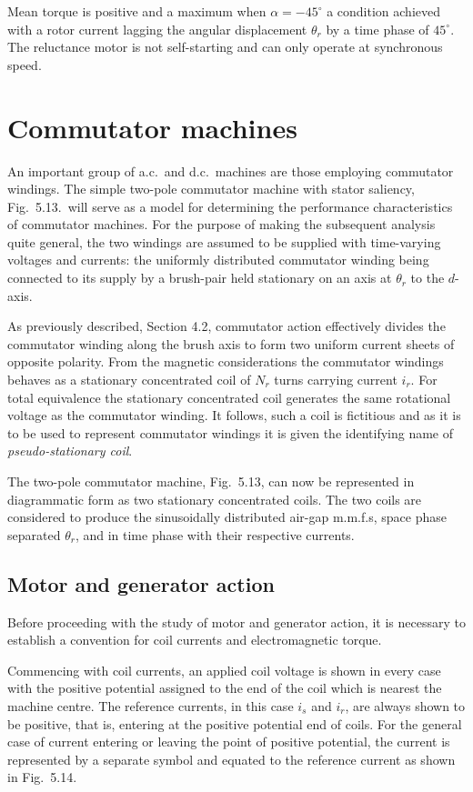 \documentclass[a4paper,numbers=noenddot,12pt]{scrbook}
\begin{document}
        Mean torque is positive and a maximum when $\alpha = -45^{\circ}$ a condition achieved with a rotor current lagging the angular displacement $\theta_r$ by a time phase of $45^{\circ}$. The reluctance motor is not self-starting and can only operate at synchronous speed.

        \section{Commutator machines}
        An important group of a.c.\ and d.c.\ machines are those employing commutator windings. The simple two-pole commutator machine with stator saliency, Fig.\ 5.13.\ will serve as a model for determining the performance characteristics of commutator machines. For the purpose of making the subsequent analysis quite general, the two windings are assumed to be supplied with time-varying voltages and currents: the uniformly distributed commutator winding being connected to its supply by a brush-pair held stationary on an axis at $\theta_r$ to the $d$-axis.

        As previously described, Section 4.2, commutator action effectively divides the commutator winding along the brush axis to form two uniform current sheets of opposite polarity. From the magnetic considerations the commutator windings behaves as a stationary concentrated coil of $N_r$ turns carrying current $i_r$. For total equivalence the stationary concentrated coil generates the same rotational voltage as the commutator winding. It follows, such a coil is fictitious and as it is to be used to represent commutator  windings it is given the identifying name of \emph{pseudo-stationary coil}.

        The two-pole commutator machine, Fig.\ 5.13, can now be represented in diagrammatic form as two stationary concentrated coils. The two coils are considered to produce the sinusoidally distributed air-gap m.m.f.s, space phase separated $\theta_r$, and in time phase with their respective currents.

        \subsection{Motor and generator action}
        Before proceeding with the study of motor and generator action, it is necessary to establish a convention for coil currents and electromagnetic torque.

        Commencing with coil currents, an applied coil voltage is shown in every case with the positive potential assigned to the end of the coil which is nearest the machine centre. The reference currents, in this case $i_s$ and $i_r$, are always shown to be positive, that is, entering at the positive potential end of coils. For the general case of current entering or leaving the point of positive potential, the current is represented by a separate symbol and equated to the reference current as shown in Fig.\ 5.14.
\end{document}
